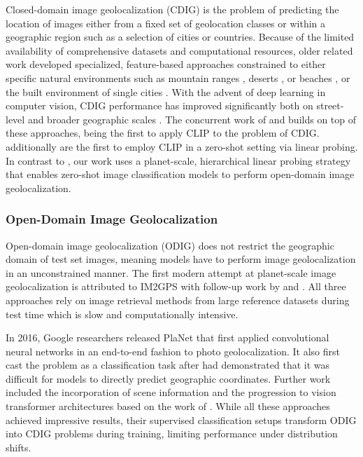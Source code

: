 \documentclass{article}
\renewcommand{\cite}[1]{\citep{#1}}
\begin{document}
Closed-domain image geolocalization (CDIG) is the problem of predicting the location of images either from a fixed set of geolocation classes or within a geographic region such as a selection of cities or countries. Because of the limited availability of comprehensive datasets and computational resources, older related work developed specialized, feature-based approaches constrained to either specific natural environments such as mountain ranges \cite{baatz_2012, saurer_2016}, deserts \cite{tzeng_2013}, or beaches \cite{cao_2012}, or the built environment of single cities \cite{zamir_shah_2010, zamir_shah_2014}. With the advent of deep learning in computer vision, CDIG performance has improved significantly both on street-level \cite{berton_2022a} and broader geographic scales \cite{suresh_2018}. The concurrent work of \citet{wu_huang_2022} and \citet{luo_2022} builds on top of these approaches, being the first to apply CLIP \cite{radford21a} to the problem of CDIG. \citet{wu_huang_2022} additionally are the first to employ CLIP in a zero-shot setting via linear probing. In contrast to \citet{wu_huang_2022}, our work uses a planet-scale, hierarchical linear probing strategy that enables zero-shot image classification models to perform open-domain image geolocalization.

\subsubsection{Open-Domain Image Geolocalization}

Open-domain image geolocalization (ODIG) does not restrict the geographic domain of test set images, meaning models have to perform image geolocalization in an unconstrained manner. The first modern attempt at planet-scale image geolocalization is attributed to IM2GPS \cite{hays_2008} with follow-up work by \citet{zamir_shah_2014} and \citet{vo_et_al}. All three approaches rely on image retrieval methods from large reference datasets during test time which is slow and computationally intensive.

In 2016, Google researchers released PlaNet \cite{Weyand_2016} that first applied convolutional neural networks \cite{krizhevsky_2012} in an end-to-end fashion to photo geolocalization. It also first cast the problem as a classification task after \citet{de_brebisson_2015} had demonstrated that it was difficult for models to directly predict geographic coordinates. Further work included the incorporation of scene information \cite{budack_2018} and the progression to vision transformer architectures \cite{pramanick_2022} based on the work of \citet{vaswani_2017}. While all these approaches achieved impressive results, their supervised classification setups transform ODIG into CDIG problems during training, limiting performance under distribution shifts.
\end{document}

